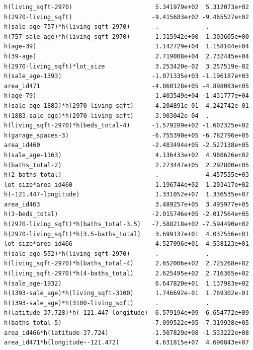 \documentclass[
]{article}
\begin{document}
\begin{verbatim}
h(living_sqft-2970)                       5.341979e+02  5.312073e+02
h(2970-living_sqft)                      -9.415683e+02 -9.465527e+02
h(sale_age-757)*h(living_sqft-2970)       .             .           
h(757-sale_age)*h(living_sqft-2970)       1.315942e+00  1.303605e+00
h(age-39)                                 1.142729e+04  1.158104e+04
h(39-age)                                 2.719008e+04  2.732445e+04
h(2970-living_sqft)*lot_size              3.253420e-02  3.257519e-02
h(sale_age-1393)                         -1.071335e+03 -1.196187e+03
area_id471                               -4.860128e+05 -4.898083e+05
h(age-79)                                -1.403549e+04 -1.431777e+04
h(sale_age-1883)*h(2970-living_sqft)      4.204891e-01  4.242742e-01
h(1883-sale_age)*h(2970-living_sqft)     -3.903042e-04  .           
h(living_sqft-2970)*h(beds_total-4)      -1.579289e+02 -1.602325e+02
h(garage_spaces-3)                       -6.755390e+05 -6.782796e+05
area_id460                               -2.483494e+05 -2.527138e+05
h(sale_age-1163)                          4.136433e+02  4.980626e+02
h(baths_total-2)                          2.273447e+05  2.292800e+05
h(2-baths_total)                          .            -4.457555e+03
lot_size*area_id460                       1.196744e+02  1.203417e+02
h(-121.447-longitude)                     1.331052e+07  1.336535e+07
area_id463                                3.489257e+05  3.495977e+05
h(3-beds_total)                          -2.015746e+05 -2.017564e+05
h(2970-living_sqft)*h(baths_total-3.5)   -7.588218e+02 -7.594490e+02
h(2970-living_sqft)*h(3.5-baths_total)    3.699137e+01  4.037556e+01
lot_size*area_id466                       4.527096e+01  4.538123e+01
h(sale_age-552)*h(living_sqft-2970)       .             .           
h(living_sqft-2970)*h(baths_total-4)      2.652006e+02  2.725268e+02
h(living_sqft-2970)*h(4-baths_total)      2.625495e+02  2.716365e+02
h(sale_age-1932)                          6.647820e+01  1.137983e+02
h(1393-sale_age)*h(living_sqft-3100)      1.746692e-01  1.769302e-01
h(1393-sale_age)*h(3100-living_sqft)      .             .           
h(latitude-37.728)*h(-121.447-longitude) -6.579194e+09 -6.654772e+09
h(baths_total-5)                         -7.099522e+05 -7.319938e+05
area_id466*h(latitude-37.724)            -1.507829e+08 -1.533222e+08
area_id471*h(longitude--121.472)          4.631815e+07  4.690843e+07
                                                                    

\end{verbatim}
\end{document}
